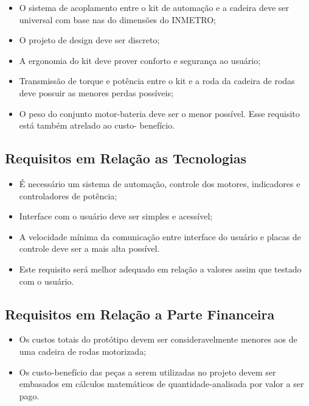   \begin{itemize}
    \item O sistema de acoplamento entre o kit de automação e a cadeira deve ser universal com base nas do dimensões do INMETRO;
    \item O projeto de design deve ser discreto;
    \item A ergonomia do kit deve prover conforto e segurança ao usuário;
    \item Transmissão de torque e potência entre o kit e a roda da cadeira de rodas deve possuir as menores perdas possíveis;
    \item O peso do conjunto motor-bateria deve ser o menor possível. Esse requisito está também atrelado ao custo- benefício.

  \end{itemize}

\subsection{Requisitos em Relação as Tecnologias}

  \begin{itemize}
    \item É necessário um sistema de automação, controle dos motores, indicadores e controladores de potência;
    \item Interface com o usuário deve ser simples e acessível;
    \item A velocidade mínima da comunicação entre interface do usuário e placas de controle deve ser a mais alta possível. \item Este requisito será melhor adequado em relação a valores assim que testado com o usuário.
  \end{itemize}

\subsection{Requisitos em Relação a Parte Financeira}
  \begin{itemize}
    \item Os custos totais do protótipo devem ser consideravelmente menores aos de uma cadeira de rodas motorizada;
    \item Os custo-benefício das peças a serem utilizadas no projeto devem ser embasados em cálculos matemáticos de quantidade-analisada por valor a ser pago.
  \end{itemize}
